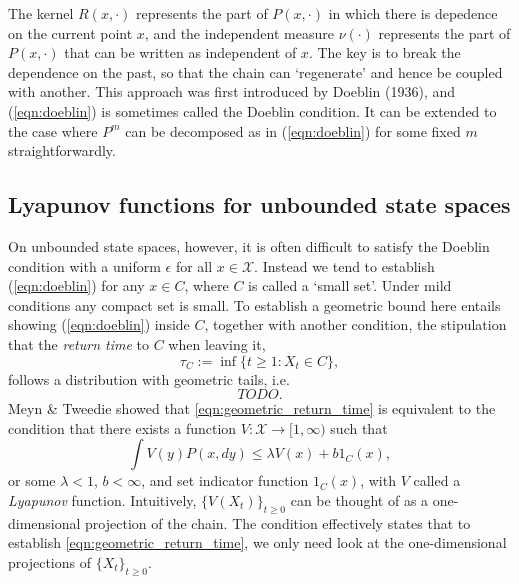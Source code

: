\documentclass{article}
\newcommand{\ch}[1]{ \{#1_t\}_{t \geq 0} }
\newcommand{\X}{\mathcal{X}}
\begin{document}
The kernel $R(x,\cdot)$ represents the part of $P(x,\cdot)$ in which there is depedence on the current point $x$, and the independent measure $\nu(\cdot)$ represents the part of $P(x,\cdot)$ that can be written as independent of $x$.  The key is to break the dependence on the past, so that the chain can `regenerate' and hence be coupled with another.  This approach was first introduced by Doeblin (1936), and (\ref{eqn:doeblin}) is sometimes called the Doeblin condition.  It can be extended to the case where $P^m$ can be decomposed as in (\ref{eqn:doeblin}) for some fixed $m$ straightforwardly.


\subsection{Lyapunov functions for unbounded state spaces}
On unbounded state spaces, however, it is often difficult to satisfy the Doeblin condition with a uniform $\epsilon$ for all $x \in \X$.  Instead we tend to establish (\ref{eqn:doeblin}) for any $x \in C$, where $C$ is called a `small set'.  Under mild conditions any compact set is small.  To establish a geometric bound here entails showing (\ref{eqn:doeblin}) inside $C$, together with another condition, the stipulation that the \emph{return time} to $C$ when leaving it,
\begin{equation} \label{eqn:return}
\tau_C := \inf \{ t \geq 1 : X_t \in C \},
\end{equation}
follows a distribution with geometric tails, i.e.
\begin{equation}
TODO. \label{eqn:geometric_return_time}
\end{equation}
Meyn \& Tweedie showed that \eqref{eqn:geometric_return_time} is equivalent to the condition that there exists a function $V: \X \to [1,\infty)$ such that
\begin{equation}
\int V(y)P(x,dy) \leq \lambda V(x) + b1_C(x), \label{eqn:lyapunov_condition}
\end{equation}
or some $\lambda<1$, $b < \infty$, and set indicator function $1_C(x)$, with $V$ called a \emph{Lyapunov} function.  Intuitively, $\{ V(X_t) \}_{t \geq 0}$ can be thought of as a one-dimensional projection of the chain.  The condition effectively states that to establish \eqref{eqn:geometric_return_time}, we only need look at the one-dimensional projections of $\ch{X}$.
\end{document}
